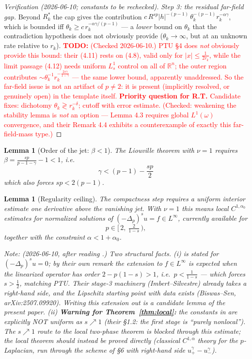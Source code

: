 \documentclass[11pt]{amsart}
\theoremstyle{plain}
\newtheorem{lemma}[theorem]{Lemma}
\theoremstyle{definition}
\theoremstyle{remark}
\newcommand{\R}{\mathbb{R}}
\newcommand{\fpl}[1]{(-\Delta_p)^{s}#1}            %
\newcommand{\al}{\alpha}
\newcommand{\TODO}[1]{\textcolor{red}{\textbf{TODO:} #1}}
\newcommand{\NOTE}[1]{\textcolor{blue!70!black}{\textit{Note: #1}}}
\begin{document}
\begin{proof}[Verification (2026-06-10; constants to be rechecked)]
\emph{Step 3: the residual far-field gap.}
Beyond $R^*_k$ the cap gives the contribution
$c\,R^{sp}|h|^{-(p-1)}\,\theta_k^{-(p-1)}r_k^{-\al\gamma}$, which is
bounded iff $\theta_k\ge c\,r_k^{-\al\gamma/(p-1)}$ --- a \emph{lower}
bound on $\theta_k$ that the contradiction hypothesis does not obviously
provide ($\theta_k\to\infty$, but at an unknown rate relative to $r_k$).
\TODO{(Checked 2026-06-10.) PTU \S4 does \emph{not} obviously provide
this bound: their (4.11) rests on (4.8), valid only for
$|x|\le\frac{1}{2r_k}$, while the limit passage (4.12) needs uniform
$L^1_s$ control on all of $\R^n$; the outer region contributes
$\sim\theta_k^{-1}r_k^{-\frac{2s\gamma}{1-\gamma}}$ --- the same lower
bound, apparently unaddressed. So the far-field issue is not an artifact
of $p\neq2$: it is present (implicitly resolved, or genuinely open) in
the template itself. \textbf{Priority question for R.T.} Candidate
fixes: dichotomy $\theta_k\gtrless r_k^{-\delta}$; cutoff with error
estimate. (Checked: weakening the stability lemma is \emph{not} an
option --- \cite{CS-approx} Lemma 4.3 requires global $L^1(\omega)$
convergence, and their Remark 4.4 exhibits a counterexample of exactly
this far-field-mass type.)}
\end{proof}
\begin{lemma}[Order of the jet: $\beta<1$]\label{lem:beta}
The Liouville theorem with $\nu=1$ requires
$\beta=\frac{sp}{p-1-\gamma}-1<1$, i.e.
\[
  \boxed{\;\gamma<(p-1)-\frac{sp}{2}\;}
\]
which also forces $sp<2(p-1)$.
\end{lemma}
\begin{lemma}[Regularity ceiling]\label{lem:ceiling}
The compactness step requires a uniform interior estimate one derivative
above the vanishing jet. With $\nu=1$ this means local $C^{1,\al_0}$
estimates for normalized solutions of $\fpl{u}=f\in L^\infty$, currently
available for
\[
  p\in\Big[\,2,\ \tfrac{2}{1-s}\,\Big),
\]
together with the constraint $\al<1+\al_0$.
\end{lemma}
\NOTE{(2026-06-10, after reading \cite{GJS}.) Two structural facts.
(i) \cite{GJS} is stated for $\fpl{u}=0$; by their own remark the
extension to $f\in L^\infty$ is expected when the linearized operator
has order $2-p(1-s)>1$, i.e.\ $p<\frac{1}{1-s}$ --- which forces
$s>\frac12$, matching PTU. Their stage-3 machinery (Imbert--Silvestre)
already takes a right-hand side, and the Lipschitz starting point with
data exists (Biswas--Sen, arXiv:2507.09920). Writing this extension out
is a candidate lemma of the present paper.
(ii) \textbf{Warning for Theorem~\ref{thm:local}:} the constants in
\cite{GJS} are explicitly NOT uniform as $s\nearrow1$ (their \S1.2:
the first stage is ``purely nonlocal''). The $s\nearrow1$ route to the
local two-phase theorem is blocked through this estimate; the local
theorem should instead be proved directly (classical $C^{1,\alpha}$
theory for the $p$-Laplacian, run through the scheme of \cite{CP} \S6
with right-hand side $u_+^\gamma-u_-^\gamma$).}
\end{document}
